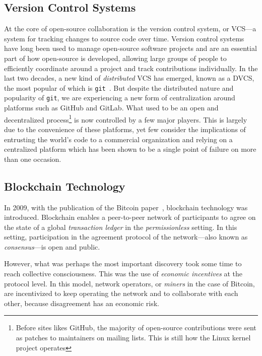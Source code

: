 
\subsection{Version Control Systems} At the core of open-source collaboration
is the version control system, or VCS---a system for tracking changes to source
code over time. Version control systems have long been used to manage
open-source software projects and are an essential part of how open-source is
developed, allowing large groups of people to efficiently coordinate around a
project and track contributions individually. In the last two decades, a new
kind of \emph{distributed} VCS has emerged, known as a DVCS, the most popular
of which is \texttt{git}~\cite{git}. But despite the distributed nature
and popularity of \texttt{git}, we are experiencing a new form of
centralization around platforms such as GitHub and GitLab.  What used to be an
open and decentralized process\footnote{Before sites likes GitHub, the majority
of open-source contributions were sent as patches to maintainers on mailing
lists. This is still how the Linux kernel project operates} is now controlled
by a few major players. This is largely due to the convenience of these
platforms, yet few consider the implications of entrusting the world's code to
a commercial organization and relying on a centralized platform which has been
shown to be a single point of failure on more than one occasion.

\subsection{Blockchain Technology} In 2009, with the publication of the Bitcoin
paper~\cite{bitcoin}, blockchain technology was introduced. Blockchain enables
a peer-to-peer network of participants to agree on the state of a global
\emph{transaction ledger} in the \emph{permissionless} setting. In this
setting, participation in the agreement protocol of the network---also known as
\emph{consensus}---is open and public.

However, what was perhaps the most important discovery took some time to reach
collective consciousness. This was the use of \emph{economic incentives} at the
protocol level. In this model, network operators, or \emph{miners} in the
case of Bitcoin, are incentivized to keep operating the network and to
collaborate with each other, because disagreement has an economic risk.

